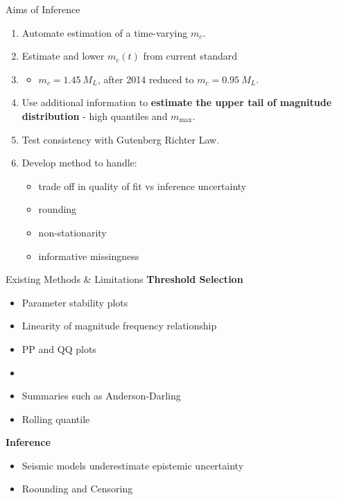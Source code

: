 \begin{frame}{Aims of Inference}
    \begin{enumerate}
        \item Automate estimation of a time-varying $m_c$.
        \item Estimate and lower $m_c(t)$ from current standard
        \item []
        \begin{itemize}
            \item $m_c= 1.45~M_L$, after 2014 reduced to $m_c = 0.95~M_L$.
        \end{itemize}
        \item Use additional information to \textbf{estimate the upper tail of magnitude distribution} - high quantiles and $m_{\text{max}}$. 
        \item Test consistency with Gutenberg Richter Law.
        \item Develop method to handle:
    \begin{itemize}
        \item trade off in quality of fit vs inference uncertainty
        \item rounding
        \item non-stationarity
        \item informative missingness
        \end{itemize}
    \end{enumerate}
\end{frame}


\begin{frame}{Existing Methods \& Limitations}
\textbf{Threshold Selection}
\begin{itemize}
    \item Parameter stability plots
    \item Linearity of magnitude frequency relationship
    \item PP and QQ plots 
    \item []
    \item Summaries such as Anderson-Darling
    \item Rolling quantile
\end{itemize}

\textbf{Inference}
\begin{itemize}
    \item Seismic models underestimate epistemic uncertainty
    \item Roounding and Censoring
\end{itemize}
\end{frame}

